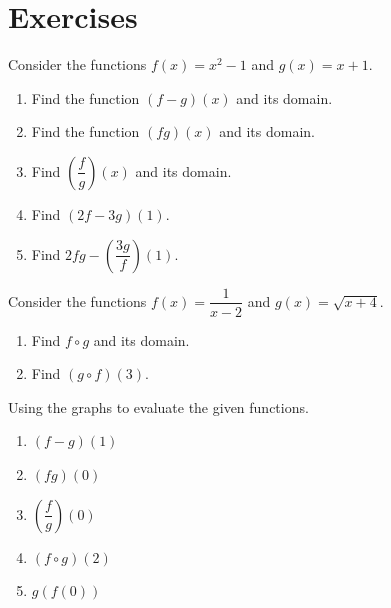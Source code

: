 \newpage

\section*{Exercises}

\begin{exercise}
  Consider the functions \(f(x)=x^2-1\) and \(g(x)=x+1\). 
  \begin{enumerate}
    \item Find the function \((f-g)(x)\) and its domain.
    \item Find the function \((fg)(x)\) and its domain.
    \item Find \(\left(\dfrac{f}{g}\right)(x)\) and its domain.
    \item Find \((2f-3g)(1)\).
    \item Find \(2fg-\left(\dfrac{3g}{f}\right)(1)\).
  \end{enumerate}
\end{exercise}

\begin{exercise}
  Consider the functions $f(x)=\dfrac{1}{x-2}$ and $g(x)=\sqrt{x+4}$.

\begin{enumerate}
  \item Find $f\circ g$ and its domain.
  \item Find $(g\circ f)(3)$.
\end{enumerate}
\end{exercise}

\newpage

\begin{exercise}
    Using the graphs to evaluate the given functions.
    \begin{multicols}{2}
      \begin{enumerate}
        \item $(f-g)(1)$
        \item $(fg)(0)$
        \item $\left(\dfrac{f}{g}\right)(0)$
        \item $(f\circ g)(2)$
        \item $g(f(0))$
      \end{enumerate}

      \columnbreak


    \end{multicols}
\end{exercise}
\vspace*{-0.2\textheight}

